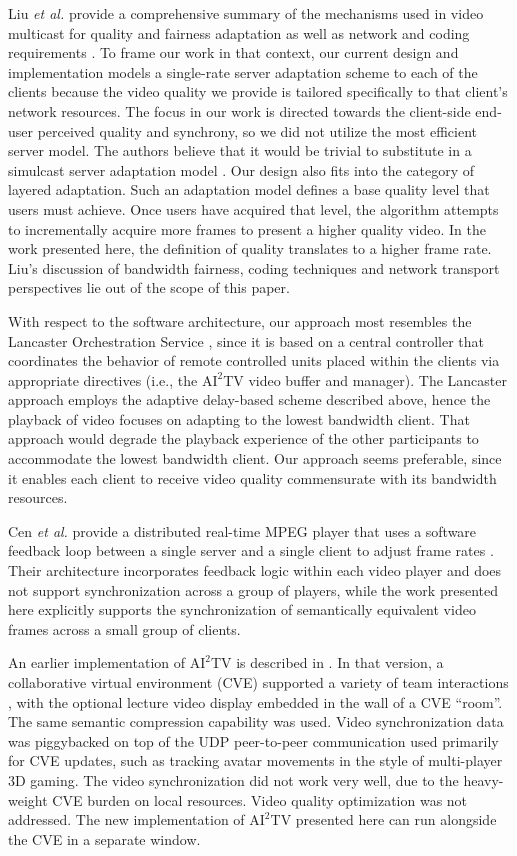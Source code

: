 \documentclass{sig-alternate}
\begin{document}
Liu {\it et al.} provide a comprehensive summary of the mechanisms
used in video multicast for quality and fairness adaptation as well as
network and coding requirements \cite{LIU2003}.  To frame our work in
that context, our current design and implementation models a
single-rate server adaptation scheme to each of the clients because
the video quality we provide is tailored specifically to that client's
network resources.  The focus in our work is directed towards the
client-side end-user perceived quality and synchrony, so we did not
utilize the most efficient server model.  The authors believe that it
would be trivial to substitute in a simulcast server adaptation model
\cite{cheung96use,li99video}.  Our design also fits into the category
of layered adaptation.  Such an adaptation model defines a base
quality level that users must achieve.  Once users have acquired that
level, the algorithm attempts to incrementally acquire more frames to
present a higher quality video.  In the work presented here, the
definition of quality translates to a higher frame rate.  Liu's
discussion of bandwidth fairness, coding techniques and network
transport perspectives lie out of the scope of this paper.

With respect to the software architecture, our approach most resembles
the Lancaster Orchestration Service \cite{Lancaster}, since it is
based on a central controller that coordinates the behavior of remote
controlled units placed within the clients via appropriate directives
(i.e., the $\mathrm{AI}^2$TV video buffer and manager).  The Lancaster
approach employs the adaptive delay-based scheme described above,
hence the playback of video focuses on adapting to the lowest
bandwidth client.  That approach would degrade the playback experience
of the other participants to accommodate the lowest bandwidth client.
Our approach seems preferable, since it enables each client to receive
video quality commensurate with its bandwidth resources.

Cen {\it et al.} provide a distributed real-time MPEG player that uses
a software feedback loop between a single server and a single client
to adjust frame rates \cite{CEN}.  Their architecture incorporates
feedback logic within each video player and does not support
synchronization across a group of players, while the work presented
here explicitly supports the synchronization of semantically
equivalent video frames across a small group of clients.

An earlier implementation of $\mathrm{AI}^2$TV is described in
\cite{VECTORS}.  In that version, a collaborative virtual environment
(CVE) supported a variety of team interactions \cite{CHIME}, with the
optional lecture video display embedded in the wall of a CVE ``room''.
The same semantic compression capability was used. Video
synchronization data was piggybacked on top of the UDP peer-to-peer
communication used primarily for CVE updates, such as tracking avatar
movements in the style of multi-player 3D gaming.  The video
synchronization did not work very well, due to the heavy-weight CVE
burden on local resources. Video quality optimization was not
addressed.  The new implementation of $\mathrm{AI}^2$TV presented here
can run alongside the CVE in a separate window.
\end{document}
